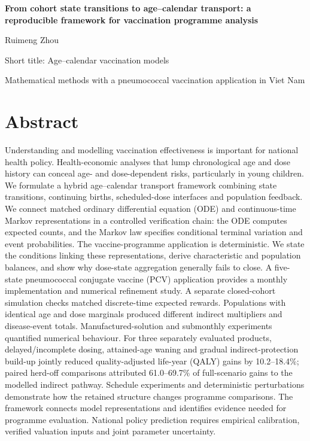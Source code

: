 \documentclass[10pt,letterpaper]{article}
\begin{document}
\begin{titlepage}
\thispagestyle{plain}
\raggedright
{\Large\bfseries From cohort state transitions to age--calendar transport: a reproducible framework for vaccination programme analysis\par}
\vspace{1cm}
Ruimeng Zhou\par
\vspace{1cm}
Short title: Age--calendar vaccination models\par
\vfill
Mathematical methods with a pneumococcal vaccination application in Viet Nam\par
\end{titlepage}
\setcounter{page}{2}
\linenumbers

\section*{Abstract}
Understanding and modelling vaccination effectiveness is important for national health policy. Health-economic analyses that lump chronological age and dose history can conceal age- and dose-dependent risks, particularly in young children. We formulate a hybrid age--calendar transport framework combining state transitions, continuing births, scheduled-dose interfaces and population feedback. We connect matched ordinary differential equation (ODE) and continuous-time Markov representations in a controlled verification chain: the ODE computes expected counts, and the Markov law specifies conditional terminal variation and event probabilities. The vaccine-programme application is deterministic. We state the conditions linking these representations, derive characteristic and population balances, and show why dose-state aggregation generally fails to close. A five-state pneumococcal conjugate vaccine (PCV) application provides a monthly implementation and numerical refinement study. A separate closed-cohort simulation checks matched discrete-time expected rewards. Populations with identical age and dose marginals produced different indirect multipliers and disease-event totals. Manufactured-solution and submonthly experiments quantified numerical behaviour. For three separately evaluated products, delayed/incomplete dosing, attained-age waning and gradual indirect-protection build-up jointly reduced quality-adjusted life-year (QALY) gains by 10.2--18.4\%; paired herd-off comparisons attributed 61.0--69.7\% of full-scenario gains to the modelled indirect pathway. Schedule experiments and deterministic perturbations demonstrate how the retained structure changes programme comparisons. The framework connects model representations and identifies evidence needed for programme evaluation. National policy prediction requires empirical calibration, verified valuation inputs and joint parameter uncertainty.
\end{document}
